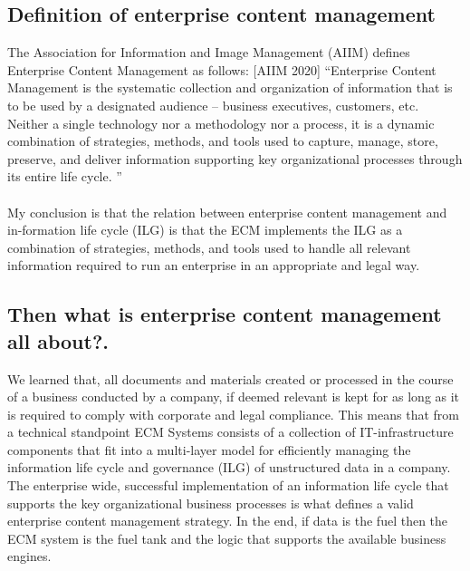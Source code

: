 \documentclass[EPiC]{easychair} %
\begin{document}
\subsection{Definition of enterprise content management }

The Association for Information and Image Management (AIIM) defines Enterprise Content Management as follows: [AIIM 2020] “Enterprise Content Management is the systematic collection and organization of information that is to be used by a designated audience – business executives, customers, etc. Neither a single technology nor a methodology nor a process, it is a dynamic combination of strategies, methods, and tools used to capture, manage, store, preserve, and deliver information supporting key organizational processes through its entire life cycle. ”   

\paragraph{} My conclusion is that the relation between enterprise content management and in-formation life cycle (ILG) is that the ECM implements the ILG as a combination of strategies, methods, and tools used to handle all relevant information required to run an enterprise in an appropriate and legal way.

\subsection{Then what is enterprise content management all about?. }

We learned that, all documents and materials created or processed in the course of a business conducted by a company, if deemed relevant is kept for as long as it is required to comply with corporate and legal compliance. This means that from a technical standpoint ECM Systems consists of a collection of IT-infrastructure components that fit into a multi-layer model for efficiently managing the information life cycle and governance (ILG) of unstructured data in a company. The enterprise wide, successful implementation of an information life cycle that supports the key organizational business processes is what defines a valid enterprise content management strategy. In the end, if data is the fuel then the ECM system is the fuel tank and the logic that supports the available business engines.
\end{document}
